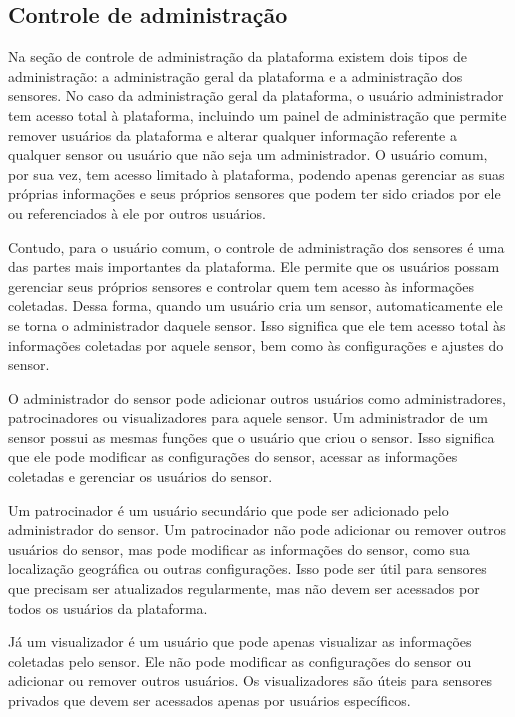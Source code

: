 \documentclass[tcc,capa]{texufpel}
\begin{document}
\subsection{Controle de administração}
Na seção de controle de administração da plataforma existem dois tipos de administração: a administração geral da plataforma e a administração dos sensores. No caso da administração geral da plataforma, o usuário administrador tem acesso total à plataforma, incluindo um painel de administração que permite remover usuários da plataforma e alterar qualquer informação referente a qualquer sensor ou usuário que não seja um administrador. O usuário comum, por sua vez, tem acesso limitado à plataforma, podendo apenas gerenciar as suas próprias informações e seus próprios sensores que podem ter sido criados por ele ou referenciados à ele por outros usuários.

Contudo, para o usuário comum, o controle de administração dos sensores é uma das partes mais importantes da plataforma. Ele permite que os usuários possam gerenciar seus próprios sensores e controlar quem tem acesso às informações coletadas. Dessa forma, quando um usuário cria um sensor, automaticamente ele se torna o administrador daquele sensor. Isso significa que ele tem acesso total às informações coletadas por aquele sensor, bem como às configurações e ajustes do sensor.

O administrador do sensor pode adicionar outros usuários como administradores, patrocinadores ou visualizadores para aquele sensor. Um administrador de um sensor possui as mesmas funções que o usuário que criou o sensor. Isso significa que ele pode modificar as configurações do sensor, acessar as informações coletadas e gerenciar os usuários do sensor.

Um patrocinador é um usuário secundário que pode ser adicionado pelo administrador do sensor. Um patrocinador não pode adicionar ou remover outros usuários do sensor, mas pode modificar as informações do sensor, como sua localização geográfica ou outras configurações. Isso pode ser útil para sensores que precisam ser atualizados regularmente, mas não devem ser acessados por todos os usuários da plataforma.

Já um visualizador é um usuário que pode apenas visualizar as informações coletadas pelo sensor. Ele não pode modificar as configurações do sensor ou adicionar ou remover outros usuários. Os visualizadores são úteis para sensores privados que devem ser acessados apenas por usuários específicos.
\end{document}
